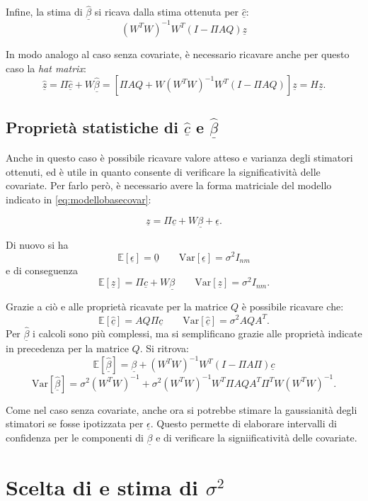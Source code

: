 \documentclass[a4paper,11pt,twoside,openright]{book}							%
\begin{document}
Infine, la stima di $\hat  {\underline \beta}$ si ricava dalla stima ottenuta per $\hat  {\underline c}$:
$$
(W^TW)^{-1}W^T(I-\Pi AQ)\underline z
$$

In modo analogo al caso senza covariate, è necessario ricavare anche per questo caso la \textit{hat matrix}:
$$
\hat  {\underline z} =\Pi\hat  {\underline c} + W \hat  {\underline \beta} = [\Pi AQ + W(W^TW)^{-1}W^T(I-\Pi AQ)]\underline z = H\underline z .
$$

\subsection*{Proprietà statistiche di $\hat  {\underline c}$ e $\hat  {\underline \beta}$}
Anche in questo caso è possibile ricavare valore atteso e varianza degli stimatori ottenuti, ed è utile in quanto consente di verificare la significatività delle covariate. Per farlo però, è necessario avere la forma matriciale del modello indicato in \ref{eq:modellobasecovar}:

\begin{equation}
\label{eq:modellobasecovarmatric}
\underline z=\Pi \underline c + W \underline \beta + \underline \epsilon .
\end{equation}

Di nuovo si ha 
$$
\mathbb{E}[\underline \epsilon] = \underline 0 \qquad \mathrm{Var}[\underline \epsilon] = \sigma^2 I_{nm}
$$
e di conseguenza
$$
\mathbb{E}[\underline z] = \Pi \underline c + W \underline \beta \qquad \mathrm{Var}[\underline z] = \sigma^2 I_{nm} .
$$

Grazie a ciò e alle proprietà ricavate per la matrice $Q$ è possibile ricavare che:
$$
\mathbb{E}[\hat  {\underline c}] = AQ\Pi \underline c \qquad \mathrm{Var}[\hat  {\underline c}] = \sigma^2 AQA^T .
$$
Per $\hat  {\underline \beta}$ i calcoli sono più complessi, ma si semplificano grazie alle proprietà indicate in precedenza per la matrice $Q$. Si ritrova:
$$
\mathbb{E}[\hat  {\underline \beta}] = \underline \beta + (W^TW)^{-1}W^T(I-\Pi A\Pi)\underline c
$$
$$ \mathrm{Var}[\hat  {\underline \beta}] = \sigma^2 (W^TW)^{-1} + \sigma^2 (W^TW)^{-1}W^T \Pi A Q A^T \Pi^T W(W^TW)^{-1}.
$$

Come nel caso senza covariate, anche ora si potrebbe stimare la gaussianità degli stimatori se fosse ipotizzata per $\underline \epsilon$. Questo permette di elaborare intervalli di confidenza per le componenti di $\underline \beta$ e di verificare la signiificatività delle covariate.


\section{Scelta di e stima di $\sigma^2$}
\end{document}
